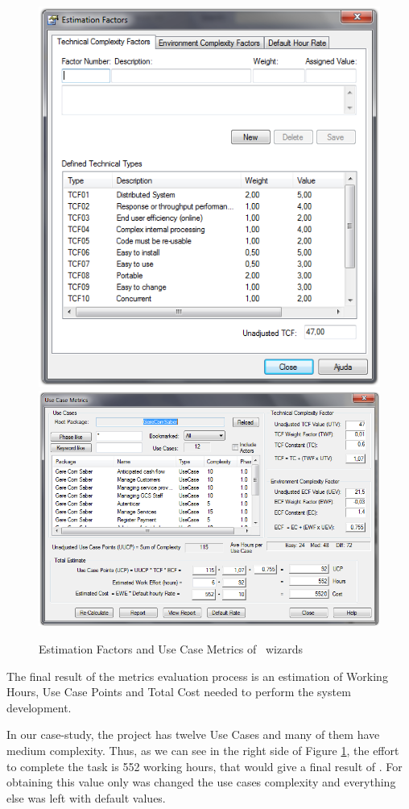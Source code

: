 \begin{figure}[!htbp]
\includegraphics[scale=0.257]{images/sparxestim.png}
\hspace{0.1cm}
\includegraphics[scale=0.29]{images/sparx.png}
\caption{Estimation Factors and Use Case Metrics of \entArch~wizards}\label{img:sparxRes}
\end{figure}

The final result of the metrics evaluation process is an estimation of Working Hours, Use Case Points\cite{Ribu01estimatingobject-oriented} and Total Cost needed to perform the system development.

In our case-study, the project has twelve Use Cases and many of them have medium complexity. 
Thus, as we can see in the right side of Figure \ref{img:sparxRes}, the effort to complete the task is 552 working hours, that would give a final result of . 
For obtaining this value only was changed the use cases complexity and everything else was left with default values.
